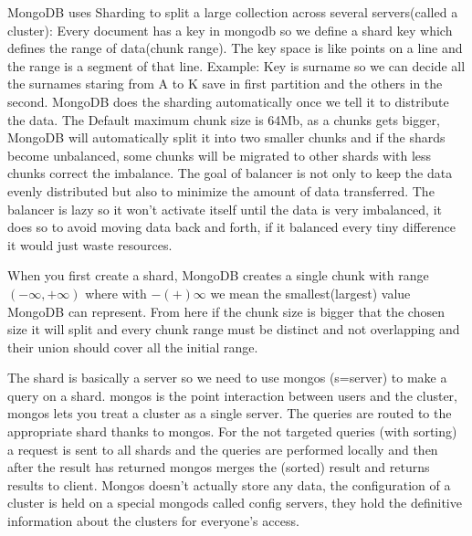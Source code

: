 \documentclass[a4page, 11pt]{article}
\begin{document}
MongoDB uses Sharding to split a large collection across several servers(called a cluster): Every document has a key in mongodb so we define a shard key which defines the range of data(chunk range). The key space is like points on a line and the range is a segment of that line.
Example: Key is surname so we can decide all the surnames staring from A to K save in first partition and the others in the second.
MongoDB does the sharding automatically once we tell it to distribute the data. 
The Default maximum chunk size is 64Mb, as a chunks gets bigger, MongoDB will automatically split it into two smaller chunks and if the shards become unbalanced, some chunks will be migrated to other shards with less chunks correct the imbalance. 
The goal of balancer is not only to keep the data evenly distributed but also to minimize the amount of data transferred. 
The balancer is lazy so it won't activate itself until the data is very imbalanced, it does so to avoid moving data back and forth, if it balanced every tiny difference it would just waste resources.

When you first create a shard, MongoDB creates a single chunk with range $(-\infty, +\infty)$ where with $-(+)\infty$ we mean the smallest(largest) value MongoDB can represent. 
From here if the chunk size is bigger that the chosen size it will split and every chunk range must be distinct and not overlapping and their union should cover all the initial range.

The shard is basically a server so we need to use mongos (s=server) to make a query on a shard. mongos is the point interaction between users and the cluster, mongos lets you treat a cluster as a single server. 
The queries are routed to the appropriate shard thanks to mongos. For the not targeted queries (with sorting) a request is sent to all shards and the queries are performed locally and then after the result has returned mongos merges the (sorted) result and returns results to client.
Mongos doesn't actually store any data, the configuration of a cluster is held on a special mongods called config servers, they hold the definitive information about the clusters for everyone's access.
\end{document}
